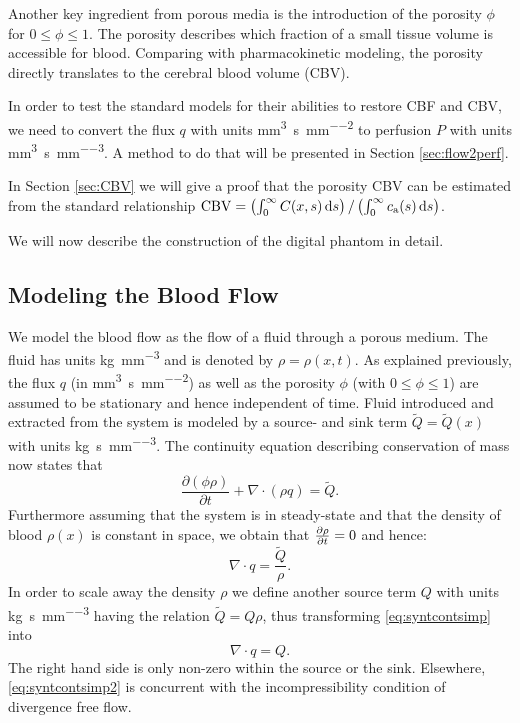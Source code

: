 \documentclass[paper=a4, fontsize=12pt,parskip=half,headings=small]{scrartcl}
\newcommand{\ca}{c_\mathrm{a}}
\newcommand{\CBV}{\mathrm{CBV}}
\newcommand{\siq}{\cubic\milli\meter\per\second\per\square\milli\meter}
\newcommand{\siP}{\cubic\milli\meter\per\second\per\cubic\milli\meter}
\newcommand{\siQ}{\kilo\gram\per\second\per\cubic\milli\meter}
\newcommand{\sirho}{\kilo\gram\per\cubic\milli\meter}
\begin{document}
	Another key ingredient from porous media is the introduction of the porosity $\phi$ for $0 \le \phi \le 1$.
	The porosity describes which fraction of a small tissue volume is accessible for blood.
	Comparing with pharmacokinetic modeling, the porosity directly translates to the cerebral blood volume (CBV).
	
	In order to test the standard models for their abilities to restore CBF and CBV, we need to convert the flux $q$ with units \si{\siq} to perfusion $P$ with units \si{\siP}. 
	A method to do that will be presented in Section \ref{sec:flow2perf}.

	In Section \ref{sec:CBV} we will give a proof that the porosity CBV can be estimated from the standard relationship $\CBV = \left(\int_0^\infty C(x,s) \diffint s\right)/\left(\int_0^\infty \ca(s) \diffint s\right)$.

	We will now describe the construction of the digital phantom in detail.
	
	
	\subsection{Modeling the Blood Flow}\label{sec:flow}
	
	We model the blood flow as the flow of a fluid through a porous medium. 
	The fluid has units \si{\sirho} and is denoted by $\rho = \rho(x,t)$.
	As explained previously, the flux $q$ (in \si{\siq}) as well as the porosity $\phi$ (with $0 \le \phi \le 1$) are assumed to be stationary and hence independent of time.
	Fluid introduced and extracted from the system is modeled by a source- and sink term $\tilde{Q} = \tilde{Q}(x)$ with units \si{\siQ}. 
	The continuity equation describing conservation of mass now states that
	\begin{equation}
		\frac{\partial (\phi \rho)}{\partial t} + \nabla \cdot (\rho q) = \tilde{Q}.
		\label{eq:syntcont}
	\end{equation} 
	Furthermore assuming that the system is in steady-state and that the density of blood $\rho(x)$ is constant in space, we obtain that $\frac{\partial \rho}{\partial t} = 0$ and hence:
	\begin{equation}
		\nabla \cdot q = \frac{\tilde{Q}}{\rho}.
		\label{eq:syntcontsimp}
	\end{equation}
	In order to scale away the density $\rho$ we define another source term $Q$ with units \si{\siQ} having the relation $\tilde{Q} = Q\rho$, thus transforming \eqref{eq:syntcontsimp} into
	\begin{equation}
		\nabla \cdot q = Q.
		\label{eq:syntcontsimp2}
	\end{equation}
	The right hand side is only non-zero within the source or the sink. 
	Elsewhere, \eqref{eq:syntcontsimp2} is concurrent with the incompressibility condition of divergence free flow.
	
\end{document}

